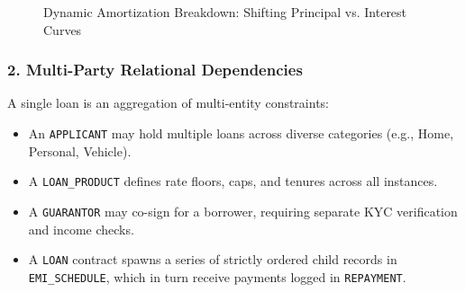 \documentclass[11pt,a4paper]{report}
\begin{document}
\begin{figure}[H]
    \centering
    \caption{Dynamic Amortization Breakdown: Shifting Principal vs. Interest Curves}
    \label{fig:amortization_curves}
\end{figure}

\subsubsection{2. Multi-Party Relational Dependencies}
A single loan is an aggregation of multi-entity constraints:
\begin{itemize}
    \item An \texttt{APPLICANT} may hold multiple loans across diverse categories (e.g., Home, Personal, Vehicle).
    \item A \texttt{LOAN\_PRODUCT} defines rate floors, caps, and tenures across all instances.
    \item A \texttt{GUARANTOR} may co-sign for a borrower, requiring separate KYC verification and income checks.
    \item A \texttt{LOAN} contract spawns a series of strictly ordered child records in \texttt{EMI\_SCHEDULE}, which in turn receive payments logged in \texttt{REPAYMENT}.
\end{itemize}
\end{document}

